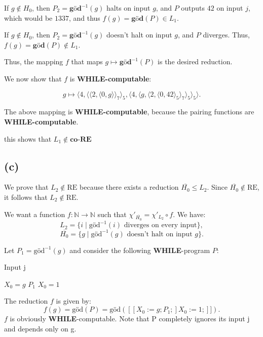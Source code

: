 \noindent
If $g \notin H_0$, then $P_2 = \textbf{göd}^{-1}(g)$ halts on input $g$,  
and $P$ outputs $42$ on input $j$, which would be $1337$,  
and thus $f(g) = \textbf{göd}(P) \in L_1$.

\noindent
If $g \notin H_0$, then $P_2 = \textbf{göd}^{-1}(g)$ doesn’t halt on input $g$, and $P$ diverges.  
Thus, $f(g) = \textbf{göd}(P) \notin L_1$.

\noindent
Thus, the mapping $f$ that maps $g \mapsto \textbf{göd}^{-1}(P)$ is the desired reduction.

\bigskip

\noindent
We now show that $f$ is \textbf{WHILE-computable}:

\[
g \mapsto \langle 4, \langle \langle 2, \langle 0, g \rangle \rangle_7 \rangle_5, \langle 4, \langle g, \langle 2, \langle 0, 42 \rangle_5 \rangle_7 \rangle_5 \rangle_5 \rangle.
\]

\noindent
The above mapping is \textbf{WHILE-computable}, because the pairing functions are \textbf{WHILE-computable}.

this shows that $L_1 \notin \textbf{co-RE} $ 

\subsection{(c)}

We prove that $L_2 \notin \text{RE}$ because there exists a reduction $\overline{H_0} \leq L_2$.  
Since $\overline{H_0} \notin \text{RE}$, it follows that $L_2 \notin \text{RE}$.

\bigskip

We want a function $f: \mathbb{N} \to \mathbb{N}$ such that $\chi'_{\overline{H_0}} = \chi'_{L_2} \circ f$.  
We have:
\[
L_2 = \{i \mid \text{göd}^{-1}(i) \text{ diverges on every input}\},
\]
\[
\overline{H_0} = \{g \mid \text{göd}^{-1}(g) \text{ doesn’t halt on input } g\}.
\]

Let $P_1 = \text{göd}^{-1}(g)$ and consider the following \textbf{WHILE}-program $P$:

\begin{algorithm}
    \caption{Input j}
    \begin{algorithmic}[1]
        \State $X_0 = g$
        \State  $P_1$
        \State $X_0 = 1$
    \end{algorithmic}
\end{algorithm}

The reduction $f$ is given by:
\[
f(g) = \text{göd}(P) = \text{göd}([\![X_0 := g; P_1;] X_0 := 1;]\!]).
\]
$f$ is obviously \textbf{WHILE}-computable.
\noindent
Note that P completely ignores its input j and depends only on g.
\bigskip

